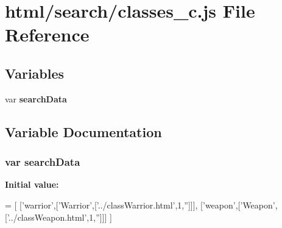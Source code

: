 \section{html/search/classes\-\_\-c.js File Reference}
\label{classes__c_8js}
\subsection*{Variables}
\begin{DoxyCompactItemize}
\item 
var {\bf search\-Data}
\end{DoxyCompactItemize}


\subsection{Variable Documentation}
\subsubsection[{search\-Data}]{\setlength{\rightskip}{0pt plus 5cm}var search\-Data}\label{classes__c_8js_ad01a7523f103d6242ef9b0451861231e}
{\bfseries Initial value\-:}
\begin{DoxyCode}
=
[
  [\textcolor{stringliteral}{'warrior'},[\textcolor{stringliteral}{'Warrior'},[\textcolor{stringliteral}{'../classWarrior.html'},1,\textcolor{stringliteral}{''}]]],
  [\textcolor{stringliteral}{'weapon'},[\textcolor{stringliteral}{'Weapon'},[\textcolor{stringliteral}{'../classWeapon.html'},1,\textcolor{stringliteral}{''}]]]
]
\end{DoxyCode}
